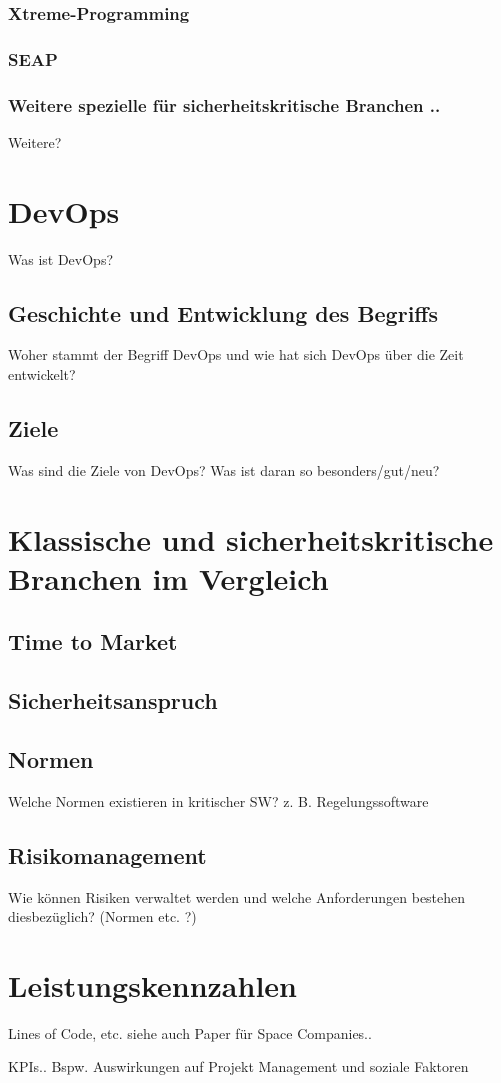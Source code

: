 \subsubsection{Xtreme-Programming}

\subsubsection{SEAP}

\subsubsection{Weitere spezielle für sicherheitskritische Branchen ..}
Weitere?

\section{DevOps}
Was ist DevOps?

\subsection{Geschichte und Entwicklung des Begriffs}
Woher stammt der Begriff DevOps und wie hat sich DevOps über die Zeit entwickelt?

\subsection{Ziele}
Was sind die Ziele von DevOps? Was ist daran so besonders/gut/neu?

\section{Klassische und sicherheitskritische Branchen im Vergleich}

\subsection{Time to Market}

\subsection{Sicherheitsanspruch}

\subsection{Normen}

Welche Normen existieren in kritischer SW? z. B. Regelungssoftware

\subsection{Risikomanagement}

Wie können Risiken verwaltet werden und welche Anforderungen bestehen diesbezüglich? (Normen etc. ?)

\section{Leistungskennzahlen}

Lines of Code, etc.
siehe auch Paper für Space Companies..

KPIs..
Bspw. Auswirkungen auf Projekt Management und soziale Faktoren

